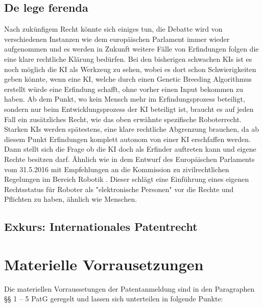 \subsection{De lege ferenda}
Nach zukünfigem Recht könnte sich einiges tun, die Debatte wird von verschiedenen 
Instanzen wie dem europäischen Parlament immer wieder aufgenommen und es 
werden in Zukunft weitere Fälle von Erfindungen folgen die eine klare rechtliche 
Klärung bedürfen. 
Bei den bisherigen schwachen KIs ist es noch möglich die KI als Werkzeug
zu sehen, wobei es dort schon Schwierigkeiten geben könnte, wenn eine KI,
welche durch einen Genetic Breeding Algorithmus erstellt würde eine Erfindung
schafft, ohne vorher einen Input bekommen zu haben.
Ab dem Punkt, wo kein Mensch mehr im Erfindungsprozess beteiligt,
sondern nur beim Entwicklungsprozess der KI beteiligt ist,
braucht es auf jeden Fall ein zusätzliches Recht, wie das 
oben erwähnte spezifische Roboterrecht.
Starken KIs werden spätestens, eine klare rechtliche Abgrenzung 
brauchen, 
da ab diesem Punkt Erfindungen komplett autonom von einer KI erschfaffen werden.
Dann stellt sich die Frage ob die KI doch als Erfinder auftreten kann 
und eigene Rechte besitzen darf. Ähnlich wie in dem Entwurf des Europäischen
Parlaments vom 31.5.2016 mit Empfehlungen an die Kommission zu zivilrechtlichen Regelungen im
Bereich Robotik \cite{delvauxMitEmpfehlungenKommission}. Dieser schlägt 
eine Einführung eines eigenen Rechtsstatus 
für Roboter als "elektronische Personen" vor die Rechte und Pflichten zu haben, 
ähnlich wie Menschen.
\\
\subsection{Exkurs: Internationales Patentrecht\label{sec:intp}}
\section{Materielle Vorrausetzungen}

Die materiellen Vorraussetungen der Patentanmeldung sind 
in den Paragraphen §§ 1 – 5 PatG geregelt 
und lassen sich unterteilen in folgende Punkte:

